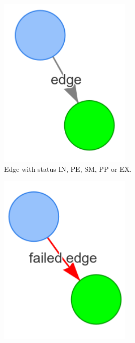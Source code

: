 \begin{figure}[H]
    \begin{subfigure}{0.33\textwidth}
    \centering
    \includegraphics[width=0.7\textwidth]{figures/proposed_method/connecting_nodes/legend/edge}
    \caption{Edge with status IN, PE, SM, PP or EX.}%
    \end{subfigure}
    \begin{subfigure}{0.33\textwidth}
    \centering
    \includegraphics[width=0.7\textwidth]{figures/proposed_method/connecting_nodes/legend/failed_edge}

\end{subfigure}
\end{figure}
